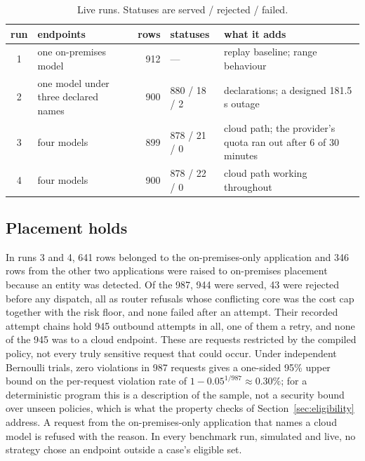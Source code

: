 \documentclass[11pt]{article}
\begin{document}
\begin{table}[t]
\centering
\small
\caption{Live runs. Statuses are served / rejected / failed.}
\label{tab:runs}
\begin{tabular}{@{}cp{3.4cm}rp{2.6cm}p{5.0cm}@{}}
\toprule
run & endpoints & rows & statuses & what it adds \\
\midrule
1 & one on-premises model & 912 & --- & replay baseline; range behaviour \\
2 & one model under three declared names & 900 & 880 / 18 / 2 & declarations; a designed 181.5\,s outage \\
3 & four models & 899 & 878 / 21 / 0 & cloud path; the provider's quota ran out after 6 of 30 minutes \\
4 & four models & 900 & 878 / 22 / 0 & cloud path working throughout \\
\bottomrule
\end{tabular}
\end{table}

\subsection{Placement holds}
\label{sec:placement}

In runs 3 and 4, 641 rows belonged to the on-premises-only application and 346 rows from the
other two applications were raised to on-premises placement because an entity was detected.
Of the 987, 944 were served, 43 were rejected before any dispatch, all as router refusals whose
conflicting core was the cost cap together with the risk floor, and none failed after an attempt. Their recorded attempt chains hold 945
outbound attempts in all, one of them a retry, and none of the 945 was to a cloud endpoint.
These are requests restricted by the compiled policy, not every truly sensitive request that
could occur. Under independent Bernoulli trials, zero violations in 987 requests
gives a one-sided 95\% upper bound on the per-request violation rate of
$1 - 0.05^{1/987} \approx 0.30\%$;
for a deterministic program this is a description of the sample, not a security bound over
unseen policies, which is what the property checks of Section~\ref{sec:eligibility} address. A
request from the on-premises-only application that names a cloud model is refused with the
reason. In every benchmark run, simulated and live, no strategy chose an endpoint outside a
case's eligible set.
\end{document}
